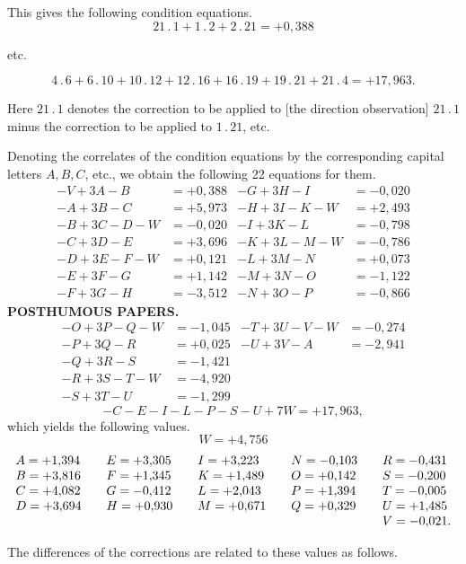 \par\noindent\hspace*{\parindent}This gives the following condition equations.
\[
21\, .\,1+1\, .\,2+2\, .\,21=+0{,}388
\]
\begin{center}etc.\end{center}
\[
4\, .\,6+6\, .\,10+10\, .\,12+12\, .\,16+16\, .\,19+19\, .\,21+21\, .\,4=+17{,}963.
\]
\par\noindent\hspace*{\parindent}Here \(21\, .\,1\) denotes the correction to be applied to [the direction observation] \(21\, .\,1\)
minus the correction to be applied to \(1\, .\,21\), etc.

\par\noindent\hspace*{\parindent}Denoting the correlates of the condition equations by the corresponding
capital letters \(A,B,C\), etc., we obtain the following
22 equations for them.
\[
\begin{aligned}
-V+3A-B&=+0{,}388 & -G+3H-I&=-0{,}020\\
-A+3B-C&=+5{,}973 & -H+3I-K-W&=+2{,}493\\
-B+3C-D-W&=-0{,}020 & -I+3K-L&=-0{,}798\\
-C+3D-E&=+3{,}696 & -K+3L-M-W&=-0{,}786\\
-D+3E-F-W&=+0{,}121 & -L+3M-N&=+0{,}073\\
-E+3F-G&=+1{,}142 & -M+3N-O&=-1{,}122\\
-F+3G-H&=-3{,}512 & -N+3O-P&=-0{,}866
\end{aligned}
\]
\clearpage
{}\hfill\textbf{POSTHUMOUS PAPERS.}
\[
\begin{aligned}
-O+3P-Q-W&=-1{,}045 & -T+3U-V-W&=-0{,}274\\
-P+3Q-R&=+0{,}025 & -U+3V-A&=-2{,}941\\
-Q+3R-S&=-1{,}421\\
-R+3S-T-W&=-4{,}920\\
-S+3T-U&=-1{,}299
\end{aligned}
\]
\[
-C-E-I-L-P-S-U+7W=+17{,}963,
\]
\noindent which yields the following values.
\[
W=+4{,}756
\]
\[
\begin{array}{l@{\qquad}l@{\qquad}l@{\qquad}l@{\qquad}l}
A=+1{,}394&E=+3{,}305&I=+3{,}223&N=-0{,}103&R=-0{,}431\\
B=+3{,}816&F=+1{,}345&K=+1{,}489&O=+0{,}142&S=-0{,}200\\
C=+4{,}082&G=-0{,}412&L=+2{,}043&P=+1{,}394&T=-0{,}005\\
D=+3{,}694&H=+0{,}930&M=+0{,}671&Q=+0{,}329&U=+1{,}485\\
&&&&V=-0{,}021.
\end{array}
\]
\par\noindent\hspace*{\parindent}The differences of the corrections are related to these values as follows.

